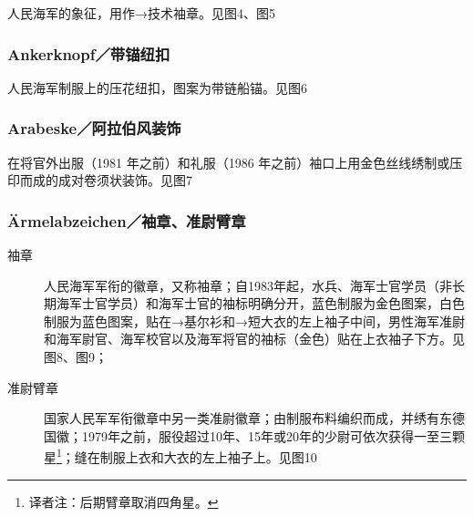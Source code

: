 人民海军的象征，用作→技术袖章。见图4、图5

\subsubsection*{Ankerknopf／带锚纽扣}%

人民海军制服上的压花纽扣，图案为带链船锚。见图6

\subsubsection*{Arabeske／阿拉伯风装饰}

在将官外出服（1981 年之前）和礼服（1986 年之前）袖口上用金色丝线绣制或压印而成的成对卷须状装饰。见图7

\subsubsection*{Ärmelabzeichen／袖章、准尉臂章}

\begin{description}

    \item[袖章] 人民海军军衔的徽章，又称袖章；自1983年起，水兵、海军士官学员（非长期海军士官学员）和海军士官的袖标明确分开，蓝色制服为金色图案，白色制服为蓝色图案，贴在→基尔衫和→短大衣的左上袖子中间，男性海军准尉和海军尉官、海军校官以及海军将官的袖标（金色）贴在上衣袖子下方。见图8、图9；

    \item[准尉臂章] 国家人民军军衔徽章中另一类准尉徽章；由制服布料编织而成，并绣有东德国徽；1979年之前，服役超过10年、15年或20年的少尉可依次获得一至三颗星\footnote{译者注：后期臂章取消四角星。\cite{clarionv}}；缝在制服上衣和大衣的左上袖子上。见图10 

\end{description}

